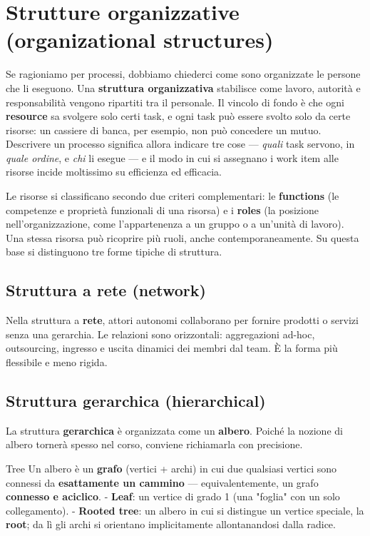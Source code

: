 \section{\texorpdfstring{Strutture organizzative (organizational structures)}{Strutture organizzative (organizational structures)}}

Se ragioniamo per processi, dobbiamo chiederci come sono organizzate le persone che li eseguono. Una \textbf{struttura organizzativa} stabilisce come lavoro, autorità e responsabilità vengono ripartiti tra il personale. Il vincolo di fondo è che ogni \textbf{resource} sa svolgere solo certi task, e ogni task può essere svolto solo da certe risorse: un cassiere di banca, per esempio, non può concedere un mutuo. Descrivere un processo significa allora indicare tre cose — \emph{quali} task servono, in \emph{quale ordine}, e \emph{chi} li esegue — e il modo in cui si assegnano i work item alle risorse incide moltissimo su efficienza ed efficacia.

Le risorse si classificano secondo due criteri complementari: le \textbf{functions} (le competenze e proprietà funzionali di una risorsa) e i \textbf{roles} (la posizione nell'organizzazione, come l'appartenenza a un gruppo o a un'unità di lavoro). Una stessa risorsa può ricoprire più ruoli, anche contemporaneamente. Su questa base si distinguono tre forme tipiche di struttura.

\subsection{\texorpdfstring{Struttura a rete (network)}{Struttura a rete (network)}}

Nella struttura a \textbf{rete}, attori autonomi collaborano per fornire prodotti o servizi senza una gerarchia. Le relazioni sono orizzontali: aggregazioni ad-hoc, outsourcing, ingresso e uscita dinamici dei membri dal team. È la forma più flessibile e meno rigida.

\subsection{\texorpdfstring{Struttura gerarchica (hierarchical)}{Struttura gerarchica (hierarchical)}}

La struttura \textbf{gerarchica} è organizzata come un \textbf{albero}. Poiché la nozione di albero tornerà spesso nel corso, conviene richiamarla con precisione.

\begin{boxdefinition}{Tree}
Un albero è un \textbf{grafo} (vertici + archi) in cui due qualsiasi vertici sono connessi da \textbf{esattamente un cammino} — equivalentemente, un grafo \textbf{connesso e aciclico}. - \textbf{Leaf}: un vertice di grado 1 (una "foglia" con un solo collegamento). - \textbf{Rooted tree}: un albero in cui si distingue un vertice speciale, la \textbf{root}; da lì gli archi si orientano implicitamente allontanandosi dalla radice.
\end{boxdefinition}

